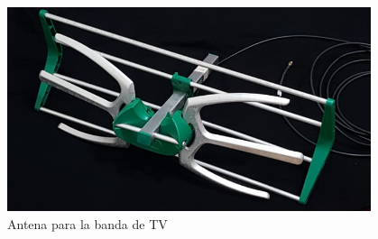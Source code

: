 \begin{frame}
\begin{columns}
\begin{itemize}
		\end{itemize}
		\begin{figure}
			\includegraphics[scale=0.20]{antena}
			\caption{Antena para la banda de TV}
		\end{figure}
\end{columns}
\end{frame}